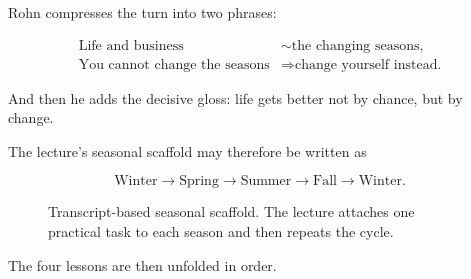 Rohn compresses the turn into two phrases:

\begin{align}
\text{Life and business} &\sim \text{the changing seasons},\\
\text{You cannot change the seasons} &\Longrightarrow \text{change yourself instead.}
\end{align}

And then he adds the decisive gloss: life gets better not by chance, but by change.

The lecture's seasonal scaffold may therefore be written as

\begin{equation}
\text{Winter} \to \text{Spring} \to \text{Summer} \to \text{Fall} \to \text{Winter}.
\end{equation}

\begin{figure}[t]
\centering
{}
\caption{Transcript-based seasonal scaffold. The lecture attaches one practical task to each season and then repeats the cycle.}
\end{figure}

The four lessons are then unfolded in order.


